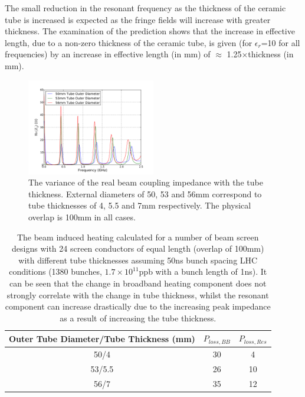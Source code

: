 The small reduction in the resonant frequency as the thickness of the ceramic tube is increased is expected as the fringe fields will increase with greater thickness. The examination of the prediction shows that the increase in effective length, due to a non-zero thickness of the ceramic tube, is given (for $\epsilon_{r}$=10 for all frequencies) by an increase in effective length (in mm) of $\approx$ 1.25$\times$thickness (in mm).

\begin{figure}
\begin{center}
\includegraphics[width=0.5\textwidth]{LHC_MKI/figures/mki-tube-thickness-real.pdf}
\end{center}
\caption{The variance of the real beam coupling impedance with the tube thickness. External diameters of 50, 53 and 56mm correspond to tube thicknesses of 4, 5.5 and 7mm respectively. The physical overlap is 100mm in all cases.}
\label{fig:tube-thickness-imp}
\end{figure}

\begin{table}
\caption{The beam induced heating calculated for a number of beam screen designs with 24 screen conductors of equal length (overlap of 100mm) with different tube thicknesses assuming 50ns bunch spacing LHC conditions (1380 bunches, $1.7\times 10^{11}$ppb with a bunch length of 1ns). It can be seen that the change in broadband heating component does not strongly correlate with the change in tube thickness, whilst the resonant component can increase drastically due to the increasing peak impedance as a result of increasing the tube thickness.}
\label{tab:thickness-heating}
\begin{center}
\begin{tabular}{c | c | c }
Outer Tube Diameter/Tube Thickness (mm)  & $P_{loss, BB}$ & $P_{loss, Res}$ \\ \hline
50/4  & 30 & 4 \\ \hline
53/5.5  & 26 & 10 \\ \hline
56/7  & 35 & 12 \\ 
\end{tabular}
\end{center}
\end{table}


